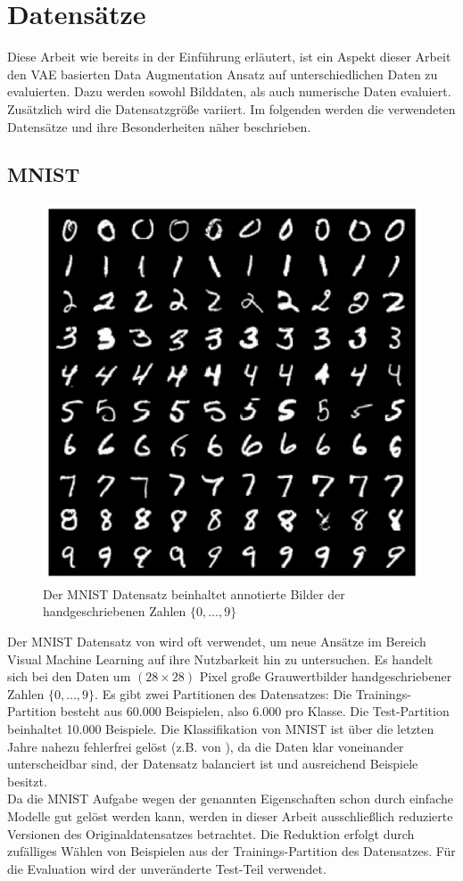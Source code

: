 \chapter{Datensätze}\label{cpt:datasets}
Diese Arbeit wie bereits in der Einführung erläutert, ist ein Aspekt dieser Arbeit den VAE basierten Data Augmentation Ansatz auf unterschiedlichen Daten zu evaluierten. Dazu werden sowohl Bilddaten, als auch numerische Daten evaluiert. Zusätzlich wird die Datensatzgröße variiert. Im folgenden werden die verwendeten Datensätze und ihre Besonderheiten näher beschrieben.



\section{MNIST}\label{sec:MNIST}
\begin{figure}[hbt]
  \centering
  \includegraphics[width=.4\textwidth]{gfx/datasets/mnist_ciffers}
  \caption{Der MNIST Datensatz beinhaltet annotierte Bilder der handgeschriebenen Zahlen $\lbrace0, \dots, 9\rbrace$}
\end{figure}
Der MNIST Datensatz von \cite{lecun-98} wird oft verwendet, um neue Ansätze im Bereich Visual Machine Learning auf ihre Nutzbarkeit hin zu untersuchen. Es handelt sich bei den Daten um $(28 \times 28)$ Pixel große Grauwertbilder handgeschriebener Zahlen $\lbrace0, \dots, 9\rbrace$. Es gibt zwei Partitionen des Datensatzes: Die Trainings-Partition besteht aus 60.000 Beispielen, also 6.000 pro Klasse. Die Test-Partition beinhaltet 10.000 Beispiele. Die Klassifikation von MNIST ist über die letzten Jahre nahezu fehlerfrei gelöst (z.B. von \cite{byerly2021branching}), da die Daten klar voneinander unterscheidbar sind, der Datensatz balanciert ist und ausreichend Beispiele besitzt. \\

Da die MNIST Aufgabe wegen der genannten Eigenschaften schon durch einfache Modelle gut gelöst werden kann, werden in dieser Arbeit ausschließlich reduzierte Versionen des Originaldatensatzes betrachtet. Die Reduktion erfolgt durch zufälliges Wählen von Beispielen aus der Trainings-Partition des Datensatzes. Für die Evaluation wird der unveränderte Test-Teil verwendet.



